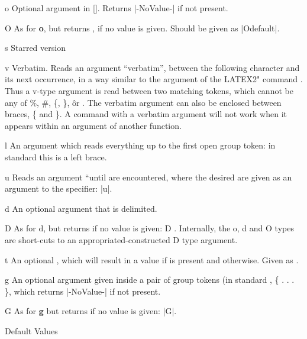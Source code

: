 \begin{margoptionslist}
\item [o] Optional argument in  []. Returns |-NoValue-| if not present.
\item [O] As for \textbf{o}, but returns , if no value is given. Should be given as |O{default}|.

\item [s] Starred version
\item [v] Verbatim. Reads an argument “verbatim”, between the following character and its next occurrence,
in a way similar to the argument of the LATEX2" command \cmd{\verb}. Thus
a v-type argument is read between two matching tokens, which cannot be any of
\%, \#, \{, \}, \^ or  . The verbatim argument can also be enclosed between braces,
\{ and \}. A command with a verbatim argument will not work when it appears
within an argument of another function.
\item [l] An argument which reads everything up to the first open group token: in standard
\latex this is a left brace.
\item [u] Reads an argument “until  are encountered, where the desired 
are given as an argument to the specifier: |u|.
\item [d] An optional argument that is delimited. 
\item [D] As for d, but returns  if no value is given: D .
Internally, the o, d and O types are short-cuts to an appropriated-constructed D
type argument.
\item [t]  An optional , which will result in a value  if  is 
            present and  otherwise. Given as .
\item [g] An optional argument given inside a pair of \tex group tokens (in standard \latex,
              \{ . . . \}, which returns |-NoValue-| if not present.
\item [G] As  for \textbf{g} but returns  if no value is given: |G|.
\end{margoptionslist}

\begin{texexample}{Default Values}{}
\DeclareDocumentCommand{}
\end{texexample}

